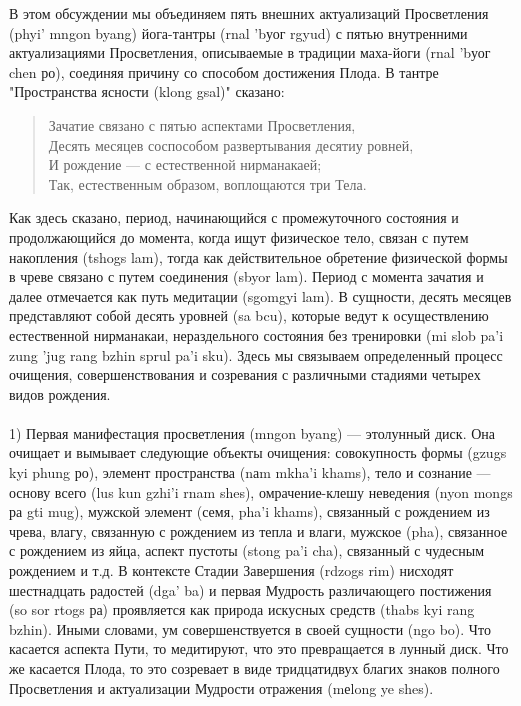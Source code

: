 В этом обсуждении мы объединяем пять внешних актуализаций Просветления (phyi' mngon byang)
йога-тантры (rnal 'bуог rgyud) с пятью внутренними актуализациями
Просветления, описываемые в традиции маха-йоги (rnal 'bуог chen ро), соединяя причину со
способом достижения Плода. В тантре "Пространства ясности (klong gsal)" сказано:
\begin{verse}
Зачатие связано с пятью аспектами Просветления,\\
Десять месяцев соспособом развертывания десятиу ровней,\\
И рождение — с естественной нирманакаей;\\
Так, естественным образом, воплощаются три Тела.
\end{verse}
Как здесь сказано, период, начинающийся с промежуточного состояния и
продолжающийся до момента, когда ищут физическое тело, связан с путем накопления
(tshogs lam), тогда как действительное обретение физической формы в чреве связано с путем
соединения (sbyor lam). Период с момента зачатия и далее отмечается как путь медитации
(sgomgyi lam). В сущности, десять месяцев представляют собой десять уровней (sa bcu),
которые ведут к осуществлению естественной нирмана\-каи, нераздельного состояния без
тренировки (mi slob pa'i zung 'jug rang bzhin sprul pa'i sku).
Здесь мы связываем определенный процесс очищения, совершенствования и
созре\-вания с различными стадиями четырех видов рождения.\\
\\
1) Первая манифестация просветления (mngon byang) — этолунный диск. Она
очищает и вымывает следующие объекты очищения: совокупность формы (gzugs kyi phung
ро), элемент пространства (nаm mkha'i khams), тело и сознание — основу всего (lus kun gzhi'i
rnam shes), омрачение-клешу неведения (nyon mongs ра gti mug), мужской элемент (семя,
pha'i khams), связанный с рождением из чрева, влагу, связанную с рождением из тепла и
влаги, мужское (pha), связанное с рождением из яйца, аспект пустоты (stong pa'i cha),
связанный с чудесным рождением и т.д. В контексте Стадии Завершения (rdzogs rim)
нисходят шестнадцать радостей (dga' ba) и первая Мудрость различающего постижения (so
sor rtogs ра) проявляется как природа искусных средств (thabs kyi rang bzhin). Иными
словами, ум совершенствуется в своей сущности (ngo bo). Что касается аспекта Пути, то
медитируют, что это превращается в лунный диск. Что же касается Плода, то это созревает в
виде тридцатидвух благих знаков полного Просветления и актуализации Мудрости
отражения (mеlong ye shes).\\
